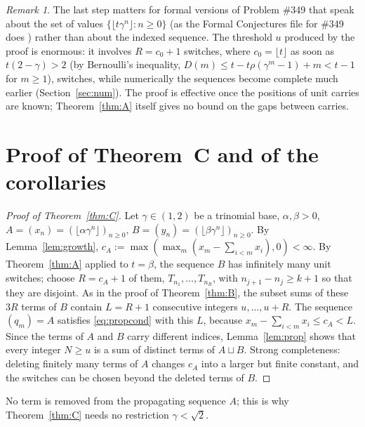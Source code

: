 \documentclass[11pt]{amsart}
\theoremstyle{definition}
\theoremstyle{remark}
\newtheorem{remark}[lemma]{Remark}
\newcommand{\fl}[1]{\lfloor #1\rfloor}
\begin{document}
\begin{remark}
The last step matters for formal versions of Problem \#349 that speak about the set of values
$\{\fl{t\gamma^n}:n\ge0\}$ (as the Formal Conjectures file for \#349 does \cite{FC}) rather than
about the indexed sequence. The threshold $u$ produced by the proof is enormous: it involves
$R=c_0+1$ switches, where $c_0=\fl t$ as soon as $t(2-\gamma)>2$ (by Bernoulli's inequality,
$D(m)\le t-t\rho(\gamma^m-1)+m<t-1$ for $m\ge1$),
switches, while numerically the sequences become complete much earlier (Section~\ref{sec:num}).
The proof is effective once the positions of unit carries are known; Theorem~\ref{thm:A}
itself gives no bound on the gaps between carries.
\end{remark}

\section{Proof of Theorem~C and of the corollaries}\label{sec:proofC}

\begin{proof}[Proof of Theorem~\ref{thm:C}]
Let $\gamma\in(1,2)$ be a trinomial base, $\alpha,\beta>0$, $A=(x_n)=(\fl{\alpha\gamma^n})_{n\ge0}$,
$B=(y_n)=(\fl{\beta\gamma^n})_{n\ge0}$. By Lemma~\ref{lem:growth},
$c_A:=\max(\max_m(x_m-\sum_{i<m}x_i),0)<\infty$. By Theorem~\ref{thm:A} applied to $t=\beta$,
the sequence $B$ has infinitely many unit switches; choose $R=c_A+1$ of them,
$T_{n_1},\dots,T_{n_R}$, with $n_{j+1}-n_j\ge k+1$ so that they are disjoint. As in the proof
of Theorem~\ref{thm:B}, the subset sums of these $3R$ terms of $B$ contain $L=R+1$
consecutive integers $u,\dots,u+R$. The sequence $(q_m)=A$ satisfies \eqref{eq:propcond}
with this $L$, because $x_m-\sum_{i<m}x_i\le c_A<L$. Since the terms of $A$ and $B$ carry
different indices, Lemma~\ref{lem:prop} shows that every integer $N\ge u$ is a sum of
distinct terms of $A\sqcup B$. Strong completeness: deleting finitely many terms of $A$
changes $c_A$ into a larger but finite constant, and the switches can be chosen beyond the
deleted terms of $B$.
\end{proof}

No term is removed from the propagating sequence $A$; this is why Theorem~\ref{thm:C} needs no
restriction $\gamma<\sqrt2$.
\end{document}
